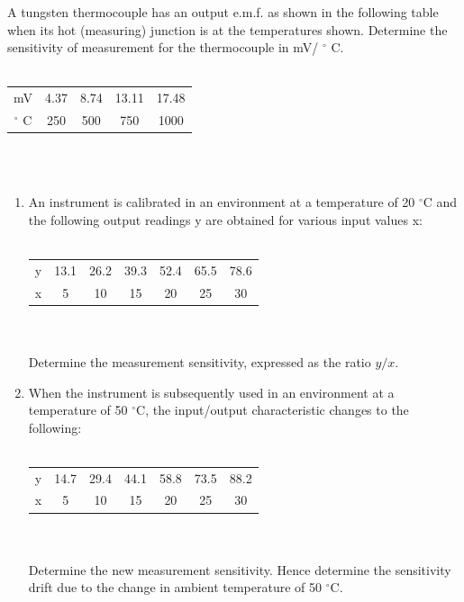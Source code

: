 \documentclass[a4paper,11pt,dvipsnames]{book}
\begin{document}
\begin{question}
A tungsten thermocouple has an output e.m.f. as shown in the following table when its hot
(measuring) junction is at the temperatures shown. Determine the sensitivity of measurement
for the thermocouple in mV/ $^{\circ}$ C.
\\ \\

\begin{tabular}{ccccc}
\hline 
mV & 4.37 & 8.74 & 13.11 & 17.48 \\ 
$^{\circ}$ C & 250 & 500 & 750 & 1000 \\ 
\hline 
\end{tabular}  \\ \\

\examspace*{5em}

\end{question}
\begin{solution}


\end{solution}



\begin{question}
\begin{enumerate}
\item An instrument is calibrated in an environment at a temperature of 20 $^{\circ}$C and the following
output readings y are obtained for various input values x: \\ \\
\begin{tabular}{ccccccc}
\hline 
y & 13.1 & 26.2 & 39.3 & 52.4 & 65.5 & 78.6 \\ 
x & 5 & 10 & 15 & 20 & 25 & 30 \\ 
\hline 
\end{tabular}  \\ \\
Determine the measurement sensitivity, expressed as the ratio $y/x$.

\item When the instrument is subsequently used in an environment at a temperature of 50 $^{\circ}$C,
the input/output characteristic changes to the following: \\ \\ 
\begin{tabular}{ccccccc}
\hline 
y & 14.7 & 29.4 & 44.1 & 58.8 & 73.5 & 88.2 \\ 
x & 5 & 10 & 15 & 20 & 25 & 30 \\ 
\hline 
\end{tabular}  \\ \\
Determine the new measurement sensitivity. Hence determine the sensitivity drift due to
the change in ambient temperature of 50 $^{\circ}$C.
\end{enumerate}

\examspace*{5em}

\end{question}
\begin{solution}

\end{solution}
\end{document}
